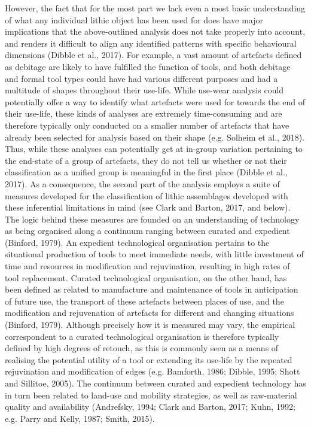 \documentclass[
]{article}
\begin{document}
However, the fact that for the most part we lack even a most basic understanding of what any individual lithic object has been used for does have major implications that the above-outlined analysis does not take properly into account, and renders it difficult to align any identified patterns with specific behavioural dimensions (Dibble et al., 2017). For example, a vast amount of artefacts defined as debitage are likely to have fulfilled the function of tools, and both debitage and formal tool types could have had various different purposes and had a multitude of shapes throughout their use-life. While use-wear analysis could potentially offer a way to identify what artefacts were used for towards the end of their use-life, these kinds of analyses are extremely time-consuming and are therefore typically only conducted on a smaller number of artefacts that have already been selected for analysis based on their shape (e.g. Solheim et al., 2018). Thus, while these analyses can potentially get at in-group variation pertaining to the end-state of a group of artefacts, they do not tell us whether or not their classification as a unified group is meaningful in the first place (Dibble et al., 2017). As a consequence, the second part of the analysis employs a suite of measures developed for the classification of lithic assemblages developed with these inferential limitations in mind (see Clark and Barton, 2017, and below). The logic behind these measures are founded on an understanding of technology as being organised along a continuum ranging between curated and expedient (Binford, 1979). An expedient technological organisation pertains to the situational production of tools to meet immediate needs, with little investment of time and resources in modification and rejuvination, resulting in high rates of tool replacement. Curated technological organisation, on the other hand, has been defined as related to manufacture and maintenance of tools in anticipation of future use, the transport of these artefacts between places of use, and the modification and rejuvenation of artefacts for different and changing situations (Binford, 1979). Although precisely how it is measured may vary, the empirical correspondent to a curated technological organisation is therefore typically defined by high degrees of retouch, as this is commonly seen as a means of realising the potential utility of a tool or extending its use-life by the repeated rejuvination and modification of edges (e.g. Bamforth, 1986; Dibble, 1995; Shott and Sillitoe, 2005). The continuum between curated and expedient technology has in turn been related to land-use and mobility strategies, as well as raw-material quality and availability (Andrefsky, 1994; Clark and Barton, 2017; Kuhn, 1992; e.g. Parry and Kelly, 1987; Smith, 2015).
\end{document}
